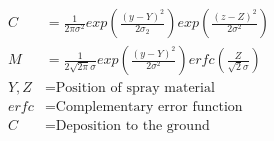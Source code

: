 \documentclass[fleqn, oneside, 11pt]{article}
\begin{document}
\begin{preview}
\begin{align*}
C & = \frac{1}{2\pi\sigma^{2}}exp\left(\frac{\left(y-Y\right)^{2}}{2\sigma_{2}}\right)exp\left(\frac{\left(z-Z\right)^{2}}{2\sigma^{2}}\right) \nonumber \\
M & = \frac{1}{2\sqrt{2\pi}\sigma}exp\left(\frac{\left(y-Y\right)^{2}}{2\sigma^{2}}\right)erfc\left(\frac{Z}{\sqrt{2}\sigma}\right) \nonumber \\
Y,Z & =  \text{Position of spray material} \nonumber \\
erfc & =  \text{Complementary error function} \nonumber \\
C & = \text{Deposition to the ground} \nonumber \\
\end{align*} 
\end{preview}
\end{document}
